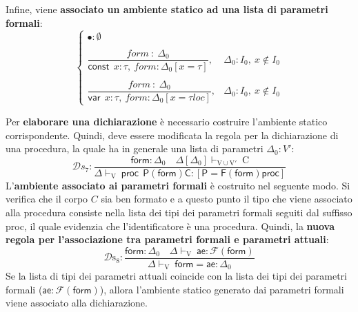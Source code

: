 \documentclass[a4paper]{article}
\begin{document}
	Infine, viene \textbf{associato un ambiente statico ad una lista di parametri formali}:
	\begin{equation*}
		\begin{cases}
			\bullet : \emptyset \\
			\\
			\dfrac{form \: : \: \Delta_{0}}{\textsf{const} \:\: x:\tau, \: form : \Delta_{0} \left[x = \tau\right]}, & \Delta_{0} : I_{0}, \: x \notin I_{0} \\
			\\
			\dfrac{form \: : \: \Delta_{0}}{\textsf{var} \:\: x:\tau, \: form : \Delta_{0} \left[x = \tau loc\right]}, & \Delta_{0} : I_{0}, \: x \notin I_{0}
		\end{cases}
	\end{equation*}\newpage
	
	\noindent
	Per \textbf{elaborare una dichiarazione} è necessario costruire l'ambiente statico corrispondente. Quindi, deve essere modificata la regola per la dichiarazione di una procedura, la quale ha in generale una lista di parametri $\Delta_{0} : V'$:
	\begin{equation*}
		\mathcal{D}s_{7} : \dfrac{
			\textsf{form}:\Delta_{0} \hspace{1em} \Delta\left[\Delta_{0}\right] \vdash_{\mathrm{V} \cup \mathrm{V}'} \: \mathrm{C}
		}{
			\Delta \vdash_{\mathrm{V}} \: \textsf{proc} \:\: \textsf{P}\left(\textsf{form}\right) \textsf{C} : \left[\textsf{P} = \mathsf{F} \left(\textsf{form}\right) \textsf{proc}\right]
		}
	\end{equation*}
	L'\textbf{ambiente associato ai parametri formali} è costruito nel seguente modo. Si verifica che il corpo $C$ sia ben formato e a questo punto il tipo che viene associato alla procedura consiste nella lista dei tipi dei parametri formali seguiti dal suffisso \textsf{proc}, il quale evidenzia che l'identificatore è una procedura. Quindi, la \textbf{nuova regola per l'associazione tra parametri formali e parametri attuali}:
	\begin{equation*}
		\mathcal{D}\mathrm{s}_{8} : \dfrac{
			\textsf{form} : \Delta_{0} \hspace{1em} \Delta\vdash_{\mathrm{V}} \: \textsf{ae} : \mathcal{F}\left(\textsf{form}\right)
		}{
			\Delta\vdash_{\mathrm{V}} \: \textsf{form} = \textsf{ae} : \Delta_{0}
		}
	\end{equation*}
	Se la lista di tipi dei parametri attuali coincide con la lista dei tipi dei parametri formali ($\textsf{ae}:\mathcal{F}\left(\textsf{form}\right)$), allora l'ambiente statico generato dai parametri formali viene associato alla dichiarazione.\newpage
	
\end{document}
